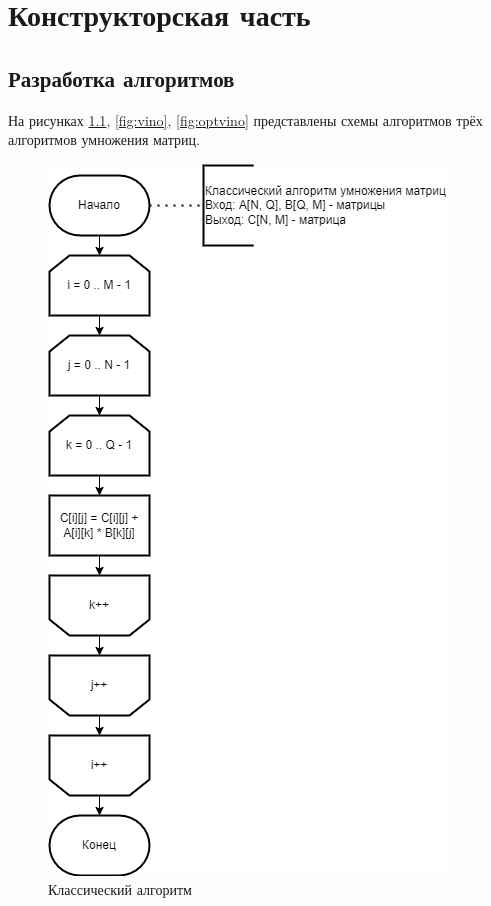 \chapter{Конструкторская часть}
	\section{Разработка алгоритмов}
На рисунках \ref{fig:classic}, \ref{fig:vino}, \ref{fig:optvino} представлены схемы алгоритмов трёх алгоритмов умножения матриц.

\begin{figure}[H]
	\centering
	\includegraphics[width=0.7\linewidth]{inc/img/classic}
	\caption{Классический алгоритм}
	\label{fig:classic}
\end{figure}

